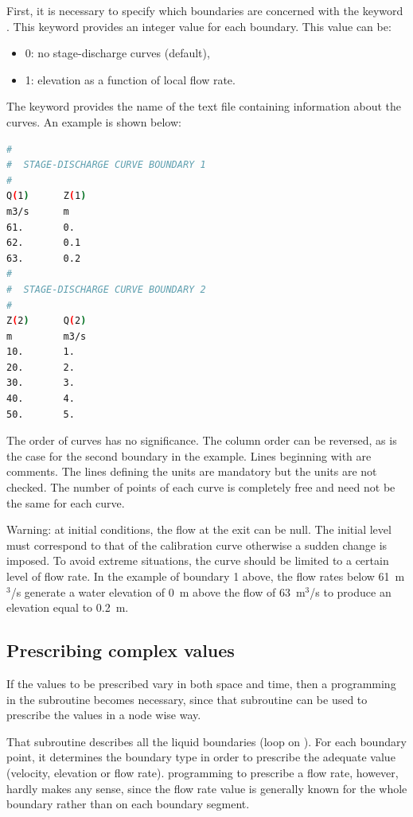 First, it is necessary to specify which boundaries are concerned with the
keyword . This keyword provides an integer value
for each boundary. This value can be:

\begin{itemize}
\item 0: no stage-discharge curves (default),

\item 1: elevation as a function of local flow rate.
\end{itemize}

The keyword  provides the name of the text
file containing information about the curves. An example is shown below:

\begin{lstlisting}[language=bash]
#
#  STAGE-DISCHARGE CURVE BOUNDARY 1
#
Q(1)      Z(1)
m3/s      m
61.       0.
62.       0.1
63.       0.2
#
#  STAGE-DISCHARGE CURVE BOUNDARY 2
#
Z(2)      Q(2)
m         m3/s
10.       1.
20.       2.
30.       3.
40.       4.
50.       5.
\end{lstlisting}

The order of curves has no significance. The column order can be reversed, as
is the case for the second boundary in the example.
Lines beginning with \telfile{\#} are comments.
The lines defining the units are mandatory but the units are not checked.
The number of points of each curve is completely free and need not be
the same for each curve.

Warning: at initial conditions, the flow at the exit can be null. The initial
level must correspond to that of the calibration curve otherwise a sudden
change is imposed. To avoid extreme situations, the curve should be limited to
a certain level of flow rate. In the example of boundary 1 above, the flow
rates below 61~m${}^{3}$/s generate a water elevation of 0~m above the flow of
63~m${}^{3}$/s to produce an elevation equal to 0.2~m.

\subsection{Prescribing complex values}

If the values to be prescribed vary in both space and time, then a programming
in the  subroutine becomes necessary, since that subroutine can
be used to prescribe the values in a node wise way.

That subroutine describes all the liquid boundaries (loop on ).
For each boundary point, it determines the boundary type in order to prescribe
the adequate value (velocity, elevation or flow rate).
 programming to prescribe a flow rate, however, hardly makes
any sense, since the flow rate value is generally known for the whole boundary
rather than on each boundary segment.

